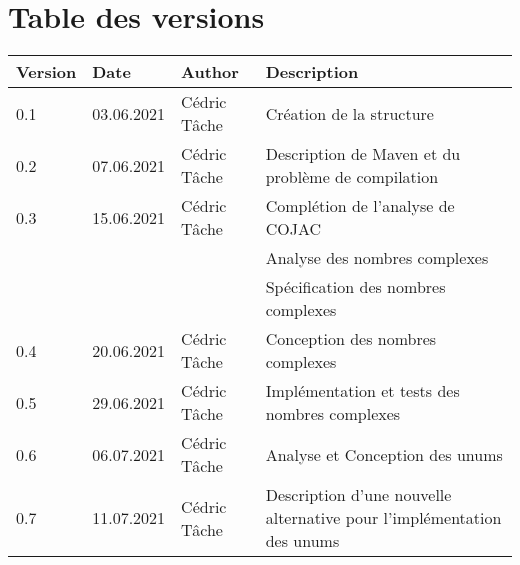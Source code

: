 \documentclass[french,11pt]{report}
\begin{document}



\section *{Table des versions}
\vspace*{0.5 cm}

\begin{table}[h]
    \begin{tabularx}{\columnwidth}{ | p{3.5em} |p{7em} | p{6.5em} | X |}
        \hline
        \textbf{Version} & \textbf{Date} & \textbf{Author} & \textbf{Description} \\
        \hline
        0.1 & 03.06.2021 & Cédric Tâche & Création de la structure \\
        0.2 & 07.06.2021 & Cédric Tâche & Description de Maven et du problème de compilation \\
        0.3 & 15.06.2021 & Cédric Tâche & Complétion de l'analyse de COJAC \\
         & & & Analyse des nombres complexes \\
         & & & Spécification des nombres complexes \\
        0.4 & 20.06.2021 & Cédric Tâche & Conception des nombres complexes \\
        0.5 & 29.06.2021 & Cédric Tâche & Implémentation et tests des nombres complexes \\
        0.6 & 06.07.2021 & Cédric Tâche & Analyse et Conception des unums \\
        0.7 & 11.07.2021 & Cédric Tâche & Description d'une nouvelle alternative pour l'implémentation des unums \\
        \hline
    \end{tabularx}
\end{table}

\newpage


\hypersetup{
	hidelinks,
	allcolors=black,
	linktocpage,
	linktoc=all
}
\tableofcontents
\newpage




\end{document}
